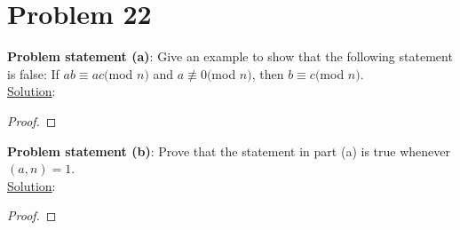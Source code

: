 \documentclass{article} %
\begin{document}
\newpage

\section*{Problem 22}


\textbf{Problem statement (a)}: Give an example to show that the following statement is false: If $ab \equiv ac($mod $n)$ and $a \not\equiv 0 ($mod $n)$, then $b \equiv c($mod $ n)$. 
\\

\underline{Solution}: 
\begin{addmargin}[1em]{0em}
\begin{proof}

\end{proof}
\end{addmargin}

\hfill \break

\textbf{Problem statement (b)}: Prove that the statement in part (a) is true whenever $(a,n) = 1$.
\\

\underline{Solution}: 
\begin{addmargin}[1em]{0em}
\begin{proof}

\end{proof}
\end{addmargin}

\end{document}
